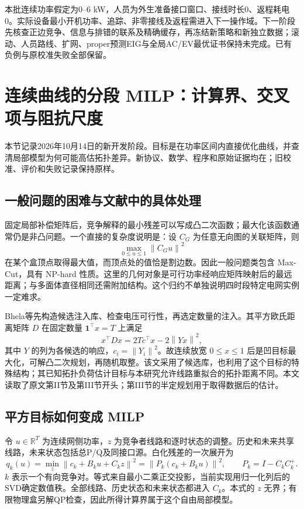 \documentclass[UTF8,fontset=fandol,11pt,a4paper]{ctexart}
\newcommand{\R}{\mathbb R}
\newcommand{\norm}[1]{\left\lVert#1\right\rVert}
\begin{document}
本批连续功率假定为0--6 kW，人员为外生准备接口窗口、接线时长0、返程耗电0。实际设备最小开机功率、追踪、非零接线及返程需进入下一操作域。下一阶段先核查正边竞争、信息与排错的联系及精确缓存，再冻结新策略和新独立数据；滚动、人员路线、扩网、proper预测EIG与全局AC/EV最优证书保持未完成。已有负例与原校准失败全部保留。

\section{连续曲线的分段 MILP：计算界、交叉项与阻抗尺度}
\label{sec:profile-milp}
本节记录2026年10月14日的新开发阶段。目标是在功率区间内直接优化曲线，并查清局部模型为何可能高估拓扑差异。新协议、数学、程序和原始证据均在；旧校准、评价和失败记录保持原样。

\subsection{一般问题的困难与文献中的具体处理}
固定局部补偿矩阵后，竞争解释的最小残差可以写成凸二次函数；最大化该函数通常仍是非凸问题。一个直接的复杂度说明是：设 $C_G$ 为任意无向图的关联矩阵，则
\[
 \max_{0\le u\le1}\norm{C_Gu}^2
\]
在某个盒顶点取得最大值，而顶点处的值恰是割边数。因此一般问题类包含 Max-Cut，具有 NP-hard 性质。这里的几何对象是可行功率经响应矩阵映射后的最远距离；与多面体直径相同还需附加结构。这个归约不单独说明四时段特定电网实例一定难求。

Bhela等\cite{bhela-probing}先构造候选注入库、检查电压可行性，再选定数量的注入。其平方欧氏距离矩阵 $D$ 在固定数量 $\mathbf1^\top x=T$ 上满足
\[
 x^\top D x=2T c^\top x-2\norm{Yx}^2,
\]
其中 $Y$ 的列为各候选的响应，$c_i=\norm{Y_i}^2$。故连续放宽 $0\le x\le1$ 后是凹目标最大化，可解凸二次规划，再随机取整。该文采用了候选库，也利用了这个目标的特殊结构；其已知拓扑负荷估计目标与本研究允许线路重拟合的拓扑距离不同。本文读取了原文第II节及第III节开头；第III节的半定规划用于取得数据后的估计。

\subsection{平方目标如何变成 MILP}
令 $u\in\R^T$ 为连续网侧功率，$z$ 为竞争者线路和逐时状态的调整。历史和未来共享线路，未来状态包括总P/Q及同接口源。白化残差的一次展开为
\begin{equation}
 q_k(u)=\min_z\norm{c_k+B_ku+C_kz}^2
       =\norm{P_k(c_k+B_ku)}^2,\qquad P_k=I-C_kC_k^+.
 \label{pm:projection}
\end{equation}
$k$ 表示一个有向竞争对。等式来自最小二乘正交投影，当前实现用归一化列后的SVD确定数值秩。全部线路、历史状态和未来状态都进入 $C_k$。本式的 $z$ 无界；有限物理盒另解QP检查，因此所得计算界属于这个自由局部模型。
\end{document}
